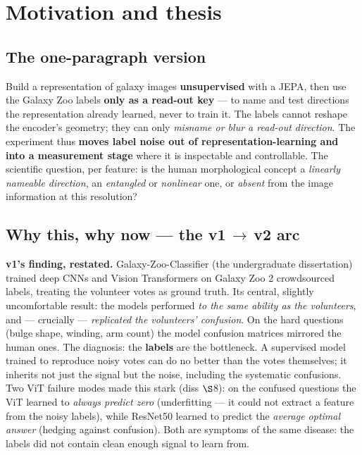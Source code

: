 \documentclass[11pt,a4paper]{article}
\begin{document}
\section{Motivation and thesis}

\subsection{The one-paragraph version}

Build a representation of galaxy images \textbf{unsupervised} with a JEPA, then use the Galaxy
Zoo labels \textbf{only as a read-out key} --- to name and test directions the representation
already learned, never to train it. The labels cannot reshape the encoder's geometry; they can
only \emph{misname or blur a read-out direction}. The experiment thus \textbf{moves label noise
out of representation-learning and into a measurement stage} where it is inspectable and
controllable. The scientific question, per feature: is the human morphological concept a
\emph{linearly nameable direction}, an \emph{entangled} or \emph{nonlinear} one, or
\emph{absent} from the image information at this resolution?

\subsection{Why this, why now --- the v1\,$\rightarrow$\,v2 arc}

\textbf{v1's finding, restated.} Galaxy-Zoo-Classifier (the undergraduate dissertation) trained
deep CNNs and Vision Transformers on Galaxy Zoo 2 crowdsourced labels, treating the volunteer
votes as ground truth. Its central, slightly uncomfortable result: the models performed
\emph{to the same ability as the volunteers}, and --- crucially --- \emph{replicated the
volunteers' confusion}. On the hard questions (bulge shape, winding, arm count) the model
confusion matrices mirrored the human ones. The diagnosis: the \textbf{labels} are the
bottleneck. A supervised model trained to reproduce noisy votes can do no better than the votes
themselves; it inherits not just the signal but the noise, including the systematic confusions.
Two ViT failure modes made this stark (diss $\S$8): on the confused questions the ViT learned
to \emph{always predict zero} (underfitting --- it could not extract a feature from the noisy
labels), while ResNet50 learned to predict the \emph{average optimal answer} (hedging against
confusion). Both are symptoms of the same disease: the labels did not contain clean enough
signal to learn from.
\end{document}
